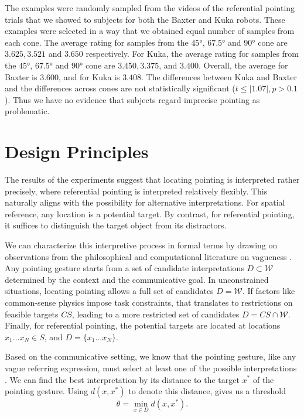 \documentclass[letterpaper]{article} %
\begin{document}
The examples were randomly sampled from the videos of the referential pointing trials that we showed to subjects for both the Baxter and Kuka robots. These examples were selected in a way that we obtained equal number of samples from each cone. The average rating for samples from the $\ang{45}$, $\ang{67.5}$ and $\ang{90}$ cone are $3.625, 3.521$
and $3.650$ respectively. For Kuka, the average rating for samples from the $\ang{45}$, $\ang{67.5}$ and $\ang{90}$ cone are $3.450, 3.375$, and $3.400$. Overall, the average for Baxter is $3.600$, and for Kuka is $3.408$. The differences between Kuka and Baxter and the differences across cones are not statistically significant ($t \leq |1.07|, p > 0.1 $).  Thus we have no evidence that subjects regard imprecise pointing as problematic.


\section{Design Principles}

The results of the experiments suggest that locating pointing is interpreted rather precisely, where referential pointing is interpreted relatively flexibly.  This naturally aligns with the possibility for alternative interpretations.  For spatial reference, any location is a potential target.  By contrast, for referential pointing, it suffices to distinguish the target object from its distractors.

We can characterize this interpretive process in formal terms by drawing on observations from the philosophical and computational literature on vagueness \cite{devault2004interpreting,graff2000shifting,kyburg2000fitting}.  Any pointing gesture starts from a set of candidate interpretations $D \subset \mathcal{W}$ determined by the context and the communicative goal.  In unconstrained situations, locating pointing allows a full set of candidates $D = \mathcal{W}.$  If factors like common-sense physics impose task constraints, that translates to restrictions on feasible targets $CS$, leading to a more restricted set of candidates $D = CS \cap \mathcal{W}$.  Finally, for referential pointing, the potential targets are located at locations $x_1 \ldots x_N \in S$, and $D = \{ x_1 \ldots x_N \}.$

Based on the communicative setting, we know that the pointing gesture, like any vague referring expression, must select at least one of the possible interpretations \cite{kyburg2000fitting}.  We can find the best interpretation by its distance to the target $x^*$ of the pointing gesture.  Using $d(x,x^*)$ to denote this distance, gives us a threshold $$\theta = \min_{x \in D} d(x, x^*).$$
\end{document}

